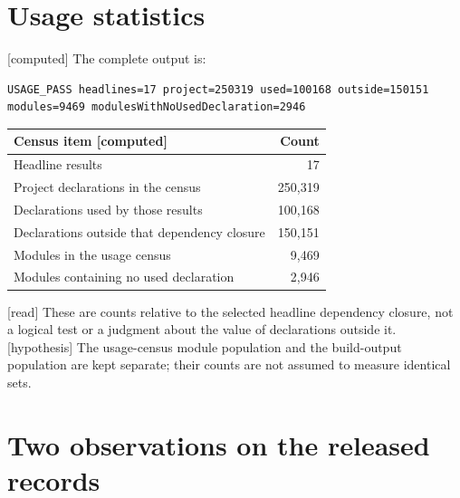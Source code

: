 \documentclass[11pt,a4paper]{article}
\theoremstyle{plain}
\theoremstyle{definition}
\theoremstyle{remark}
\numberwithin{equation}{section}
\newcommand{\st}[1]{\textsf{[#1]}}
\begin{document}
\section{Usage statistics}

\st{computed} The complete  output is:
\begingroup\scriptsize
\begin{verbatim}
USAGE_PASS headlines=17 project=250319 used=100168 outside=150151 modules=9469 modulesWithNoUsedDeclaration=2946
\end{verbatim}
\endgroup
\begin{center}\small
\begin{tabular}{@{}lr@{}}
\toprule Census item \quad\st{computed} & Count\\\midrule
Headline results & 17\\
Project declarations in the census & 250,319\\
Declarations used by those results & 100,168\\
Declarations outside that dependency closure & 150,151\\
Modules in the usage census & 9,469\\
Modules containing no used declaration & 2,946\\
\bottomrule
\end{tabular}\end{center}
\st{read} These are counts relative to the selected headline dependency closure, not a logical test or a
judgment about the value of declarations outside it.
\st{hypothesis} The usage-census module population and the build-output population are kept separate;
their counts are not assumed to measure identical sets.

\section{Two observations on the released records}
\end{document}
